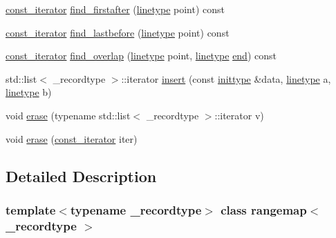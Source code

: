 \begin{DoxyCompactItemize}
\item 
\mbox{\hyperlink{classrangemap_affa7462e68d053d3a066fe0b8d46a99d}{const\+\_\+iterator}} \mbox{\hyperlink{classrangemap_a280a3884907728c081165897fe8469de}{find\+\_\+firstafter}} (\mbox{\hyperlink{classrangemap_a54c8f7622f9af4c4232d764cf9ed11fa}{linetype}} point) const
\item 
\mbox{\hyperlink{classrangemap_affa7462e68d053d3a066fe0b8d46a99d}{const\+\_\+iterator}} \mbox{\hyperlink{classrangemap_a0acf9c66dfc36b41d1a1062fa6692ff7}{find\+\_\+lastbefore}} (\mbox{\hyperlink{classrangemap_a54c8f7622f9af4c4232d764cf9ed11fa}{linetype}} point) const
\item 
\mbox{\hyperlink{classrangemap_affa7462e68d053d3a066fe0b8d46a99d}{const\+\_\+iterator}} \mbox{\hyperlink{classrangemap_a69c6328ba555fbb5382307ea9a2d9ca9}{find\+\_\+overlap}} (\mbox{\hyperlink{classrangemap_a54c8f7622f9af4c4232d764cf9ed11fa}{linetype}} point, \mbox{\hyperlink{classrangemap_a54c8f7622f9af4c4232d764cf9ed11fa}{linetype}} \mbox{\hyperlink{classrangemap_a94d0670391a58a9f30031801c4eeff49}{end}}) const
\item 
std\+::list$<$ \+\_\+recordtype $>$\+::iterator \mbox{\hyperlink{classrangemap_a076c3184225982a98757fd376b2cb6a5}{insert}} (const \mbox{\hyperlink{classrangemap_a995e3cdf45bcbbb27c59982353b2256b}{inittype}} \&data, \mbox{\hyperlink{classrangemap_a54c8f7622f9af4c4232d764cf9ed11fa}{linetype}} a, \mbox{\hyperlink{classrangemap_a54c8f7622f9af4c4232d764cf9ed11fa}{linetype}} b)
\item 
void \mbox{\hyperlink{classrangemap_a4acc95dca04c2140d28b0eca719e017d}{erase}} (typename std\+::list$<$ \+\_\+recordtype $>$\+::iterator v)
\item 
void \mbox{\hyperlink{classrangemap_a5c92c4941f0220511dcb911c0b223211}{erase}} (\mbox{\hyperlink{classrangemap_affa7462e68d053d3a066fe0b8d46a99d}{const\+\_\+iterator}} iter)
\end{DoxyCompactItemize}


\subsection{Detailed Description}
\subsubsection*{template$<$typename \+\_\+recordtype$>$\newline
class rangemap$<$ \+\_\+recordtype $>$}



